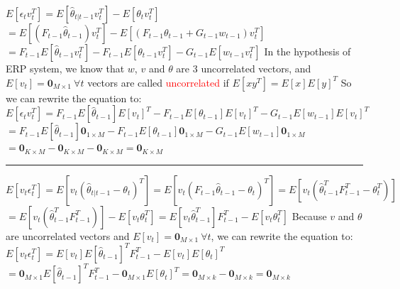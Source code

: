 \documentclass[a4 paper]{article}
\begin{document}
\begin{tcolorbox}[colback=YellowGreen!5!white,colframe=YellowGreen!75!black,title={Problem 3's answer}]
    $E[\epsilon_tv_t^T]=E[\hat{\theta}_{t|t-1}v_t^T]-E[\theta_tv_t^T]$\newline
    \hspace*{0.5cm}$=E[(F_{t-1}\hat{\theta}_{t-1})v_t^T]-E[(F_{t-1}\theta_{t-1}+G_{t-1}w_{t-1})v_t^T]$\newline
    \hspace*{0.5cm}$=F_{t-1}E[\hat{\theta}_{t-1}v_t^T]-F_{t-1}E[\theta_{t-1}v_t^T]-G_{t-1}E[w_{t-1}v_t^T]$\newline
    In the hypothesis of ERP system, we know that $w$, $v$ and $\theta$ are 3  uncorrelated vectors,\newline
    \hspace*{0.5cm}and $E[v_t]=\textbf{0}_{M\times 1}\ \forall t$ vectors are called \textcolor{red}{uncorrelated} if $E[xy^T]=E[x]E[y]^T$\newline
    So we can rewrite the equation to:\newline
    $E[\epsilon_tv_t^T]=F_{t-1}E[\hat{\theta}_{t-1}]E[v_t]^T-F_{t-1}E[\theta_{t-1}]E[v_t]^T-G_{t-1}E[w_{t-1}]E[v_t]^T$\newline
    \hspace*{0.5cm}$=F_{t-1}E[\hat{\theta}_{t-1}]\textbf{0}_{1\times M}-F_{t-1}E[\theta_{t-1}]\textbf{0}_{1\times M}-G_{t-1}E[w_{t-1}]\textbf{0}_{1\times M}$\newline
    \hspace*{0.5cm}$=\textbf{0}_{K\times M}-\textbf{0}_{K\times M}-\textbf{0}_{K\times M}=\textbf{0}_{K\times M}$\newline
    \noindent\rule[0.25\baselineskip]{\textwidth}{1pt}
    $E[v_t\epsilon_t^T]=E[v_t(\hat{\theta}_{t|t-1}-\theta_t)^T]=E[v_t(F_{t-1}\hat{\theta}_{t-1}-\theta_t)^T]=E[v_t(\hat{\theta}_{t-1}^TF_{t-1}^T-\theta_t^T)]$\newline
    \hspace*{0.5cm}$=E[v_t(\hat{\theta}_{t-1}^TF_{t-1}^T)]-E[v_t\theta_t^T]=E[v_t\hat{\theta}_{t-1}^T]F_{t-1}^T-E[v_t\theta_t^T]$\newline
    Because $v$ and $\theta$ are uncorrelated vectors and $E[v_t]=\textbf{0}_{M\times 1}\ \forall t$, we can rewrite the equation to:\newline
    $E[v_t\epsilon_t^T]=E[v_t]E[\hat{\theta}_{t-1}]^TF_{t-1}^T-E[v_t]E[\theta_t]^T$\newline
    \hspace*{0.5cm}$=\textbf{0}_{M\times 1}E[\hat{\theta}_{t-1}]^TF_{t-1}^T-\textbf{0}_{M\times 1}E[\theta_t]^T=\textbf{0}_{M\times k}-\textbf{0}_{M\times k}=\textbf{0}_{M\times k}$
\end{tcolorbox}
\end{document}
